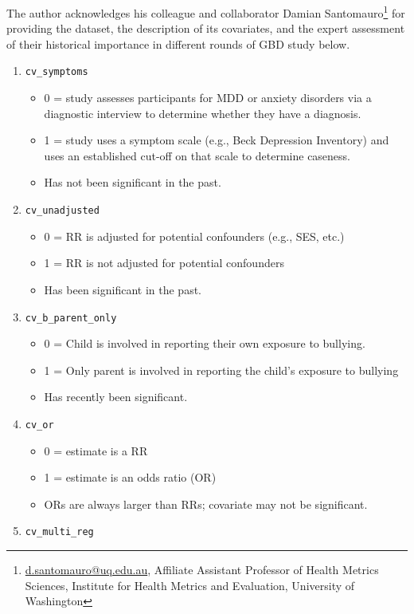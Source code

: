 \label{appendix:bullying_covariates}
The author acknowledges his colleague and collaborator Damian Santomauro\footnote{\href{mailto:d.santomauro@uq.edu.au}{d.santomauro@uq.edu.au}, Affiliate Assistant Professor of Health Metrics Sciences, Institute for Health Metrics and Evaluation, University of Washington} for providing the dataset, the description of its covariates, and the expert assessment of their historical importance in different rounds of GBD study below.
\begin{enumerate}
	\item \texttt{cv\_symptoms}
	\begin{itemize}
		\item 0 = study assesses participants for MDD or anxiety disorders via a diagnostic interview to determine whether they have a diagnosis. 
		\item 1 = study uses a symptom scale (e.g., Beck Depression Inventory) and uses an established cut-off on that scale to determine caseness. 
		\item Has not  been significant in the past. 
	\end{itemize}
	\item \texttt{cv\_unadjusted}
	\begin{itemize}
		\item 0 = RR is adjusted for potential confounders (e.g., SES, etc.)	
		\item 1 = RR is not adjusted for potential confounders
		\item Has been significant in the past.
	\end{itemize}
	\item \texttt{cv\_b\_parent\_only} 
	\begin{itemize}
		\item 0 = Child is involved in reporting their own exposure to bullying.
		\item 1 = Only parent is involved in reporting the child’s exposure to bullying
		\item Has recently been significant. 
	\end{itemize}
	\item \texttt{cv\_or}
	\begin{itemize}
		\item 0 = estimate is a RR
		\item 1 = estimate is an odds ratio (OR)
		\item ORs are always larger than RRs; covariate may not be significant. 
	\end{itemize}
	\item \texttt{cv\_multi\_reg}

\end{enumerate}
